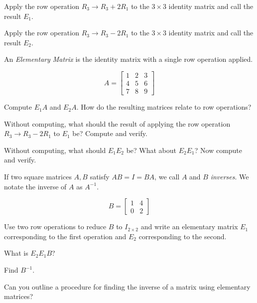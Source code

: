 \documentclass{article}
\newcommand{\mat}[1]{\begin{bmatrix}#1\end{bmatrix}}
\begin{document}
	\begin{Enum}
		\item Apply the row operation $R_3\to R_3+2R_1$ to the $3\times 3$ identity
		matrix and call the result $E_1$.
		\item Apply the row operation $R_3\to R_3-2R_1$ to the $3\times 3$ identity
		matrix and call the result $E_2$.
	\end{Enum}
	An \emph{Elementary Matrix} is the identity matrix with a single row operation applied.

	\[
		A=\mat{1&2&3\\4&5&6\\7&8&9}
	\]
	\begin{Enum}[resume]
		\item Compute $E_1A$ and $E_2A$.  How do the resulting matrices relate to row
		operations?
		\item Without computing, what should the result of applying the row
		operation $R_3\to R_3-2R_1$ to $E_1$ be?  Compute and verify.
		\item Without computing, what should $E_1E_2$ be?  What about $E_2E_1$?
		Now compute and verify.
	\end{Enum}

	If two square matrices $A,B$ satisfy $AB=I=BA$, we call $A$ and $B$ \emph{inverses}.
	We notate the inverse of $A$ as $A^{-1}$.

	\[
		B=\mat{1 &4\\0 &2}
	\]
	\begin{Enum}
		\item Use two row operations to reduce $B$ to $I_{2\times 2}$
		and write an elementary matrix $E_1$ corresponding to the first operation
		and $E_2$ corresponding to the second.
		\item What is $E_2E_1B$?
		\item Find $B^{-1}$.
		\item Can you outline a procedure for finding the inverse of a matrix
		using elementary matrices?
	\end{Enum}
\end{document}
